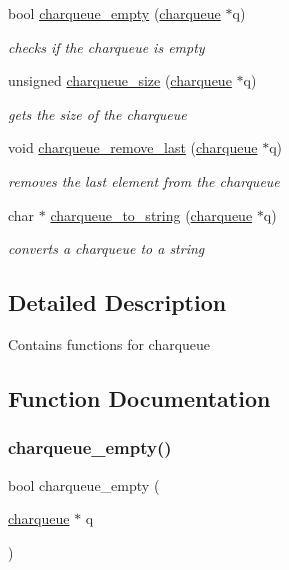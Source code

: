 \begin{DoxyCompactItemize}
bool \hyperlink{group__Queue_ga1013b749bddaf2e7b01185099ccddfa7}{charqueue\+\_\+empty} (\hyperlink{structcharqueue}{charqueue} $\ast$q)
\begin{DoxyCompactList}\small\item\em checks if the charqueue is empty \end{DoxyCompactList}\item 
unsigned \hyperlink{group__Queue_ga3df2219927af0ffc207c237f99e06331}{charqueue\+\_\+size} (\hyperlink{structcharqueue}{charqueue} $\ast$q)
\begin{DoxyCompactList}\small\item\em gets the size of the charqueue \end{DoxyCompactList}\item 
void \hyperlink{group__Queue_ga1da158a3acaebfa6285053fa52d2d917}{charqueue\+\_\+remove\+\_\+last} (\hyperlink{structcharqueue}{charqueue} $\ast$q)
\begin{DoxyCompactList}\small\item\em removes the last element from the charqueue \end{DoxyCompactList}\item 
char $\ast$ \hyperlink{group__Queue_ga27406c20bfc03f7594e296a9ff320c0a}{charqueue\+\_\+to\+\_\+string} (\hyperlink{structcharqueue}{charqueue} $\ast$q)
\begin{DoxyCompactList}\small\item\em converts a charqueue to a string \end{DoxyCompactList}\end{DoxyCompactItemize}


\subsection{Detailed Description}
Contains functions for charqueue 

\subsection{Function Documentation}
\mbox{\label{group__Queue_ga1013b749bddaf2e7b01185099ccddfa7}} 
\subsubsection{\texorpdfstring{charqueue\+\_\+empty()}{charqueue\_empty()}}
{\footnotesize\ttfamily bool charqueue\+\_\+empty (\begin{DoxyParamCaption}\item[{\hyperlink{structcharqueue}{charqueue} $\ast$}]{q }\end{DoxyParamCaption})}



